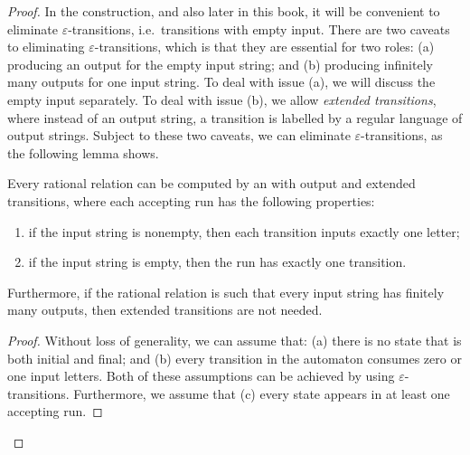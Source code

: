 \begin{proof}
            In the construction, and also later in this book,  it will be convenient to eliminate $\varepsilon$-transitions, i.e.~transitions with empty input. There are two caveats to eliminating $\varepsilon$-transitions, which is that they are  essential for two roles: (a) producing an output for the empty input string; and (b) producing infinitely many outputs for one input string.  To deal with issue (a), we will discuss the empty input separately. To deal with issue (b), we allow \emph{extended transitions}, where instead of an output string, a transition is labelled by a regular language of output strings. Subject to these two caveats, we can eliminate $\varepsilon$-transitions, as the following lemma shows.
        
        \begin{lemma}\label{lemma:eliminate-epsilon-transitions}
            Every rational relation can be computed by an \nfa with output and extended transitions, where each accepting run has the following properties:
            \begin{enumerate}
                \item if the input string is nonempty, then each transition inputs exactly one letter;
                \item if the input string is empty, then the run has exactly one transition.
            \end{enumerate}
            Furthermore, if the rational relation is such that every input string has finitely many outputs, then extended transitions are not needed.
        \end{lemma}

        \begin{proof}
        Without loss of generality, we can assume that: (a) there is no state that is both initial and final; and (b) every  transition in the automaton  consumes zero or one input letters. Both of these assumptions can be achieved by using $\varepsilon$-transitions. Furthermore, we assume that (c) every state appears in at least one accepting run. 
            

\end{proof}
\end{proof}

